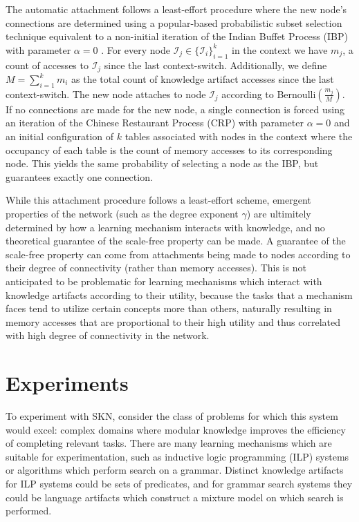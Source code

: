 \documentclass[11pt,letterpaper]{article}
\begin{document}
The automatic attachment follows a least-effort procedure where the new
node's connections are determined using a popular-based probabilistic subset
selection technique equivalent to a non-initial iteration of the Indian
Buffet Process (IBP) with parameter $\alpha=0$ \cite{griffiths11}. For every
node $\mathcal{I}_j\in\{\mathcal{I}_i\}_{i=1}^k$ in the context we have
$m_j$, a count of accesses to $\mathcal{I}_j$ since the last context-switch.
Additionally, we define $M=\sum_{i=1}^km_i$ as the total count of knowledge
artifact accesses since the last context-switch. The new node attaches to
node $\mathcal{I}_j$ according to Bernoulli$\left(\frac{m_j}{M}\right)$.
If no connections are made for the new node, a single connection is forced
using an iteration of the Chinese Restaurant Process (CRP) with parameter
$\alpha=0$ and an initial configuration of $k$ tables associated with nodes
in the context where the occupancy of each table is the count of memory
accesses to its corresponding node. This yields the same probability of
selecting a node as the IBP, but guarantees exactly one connection.

While this attachment procedure follows a least-effort scheme, emergent
properties of the network (such as the degree exponent $\gamma$) are
ultimitely determined by how a learning mechanism interacts with knowledge,
and no theoretical guarantee of the scale-free property can be made. A
guarantee of the scale-free property can come from attachments being made to
nodes according to their degree of connectivity (rather than memory
accesses). This is not anticipated to be problematic for learning mechanisms
which interact with knowledge artifacts according to their utility, because
the tasks that a mechanism faces tend to utilize certain concepts more than
others, naturally resulting in memory accesses that are proportional to
their high utility and thus correlated with high degree of connectivity in
the network.

\section{Experiments}

To experiment with SKN, consider the class of problems for which this system
would excel: complex domains where modular knowledge improves the efficiency
of completing relevant tasks. There are many learning mechanisms which are
suitable for experimentation, such as inductive logic programming (ILP)
systems or algorithms which perform search on a grammar. Distinct knowledge
artifacts for ILP systems could be sets of predicates, and for grammar
search systems they could be language artifacts which construct a mixture
model on which search is performed.
\end{document}
